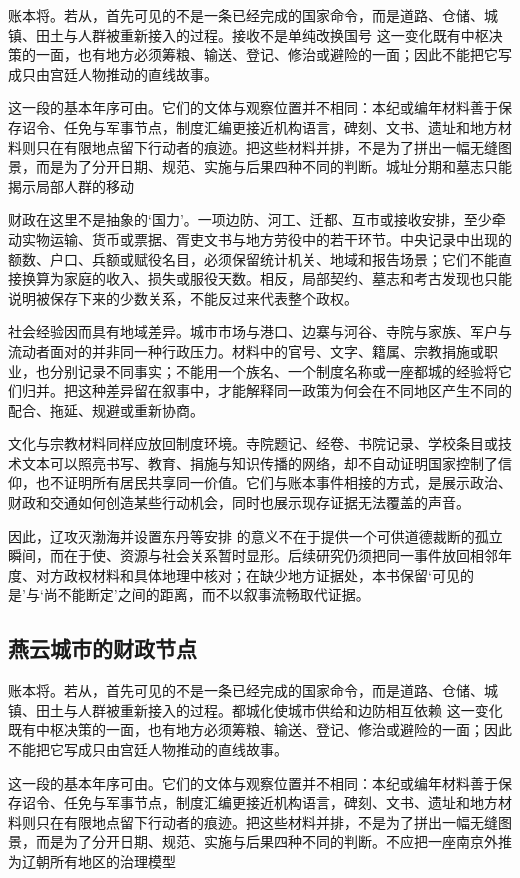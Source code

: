 账本将。若从，首先可见的不是一条已经完成的国家命令，而是道路、仓储、城镇、田土与人群被重新接入的过程。接收不是单纯改换国号 这一变化既有中枢决策的一面，也有地方必须筹粮、输送、登记、修治或避险的一面；因此不能把它写成只由宫廷人物推动的直线故事。

这一段的基本年序可由。它们的文体与观察位置并不相同：本纪或编年材料善于保存诏令、任免与军事节点，制度汇编更接近机构语言，碑刻、文书、遗址和地方材料则只在有限地点留下行动者的痕迹。把这些材料并排，不是为了拼出一幅无缝图景，而是为了分开日期、规范、实施与后果四种不同的判断。城址分期和墓志只能揭示局部人群的移动

财政在这里不是抽象的‘国力’。一项边防、河工、迁都、互市或接收安排，至少牵动实物运输、货币或票据、胥吏文书与地方劳役中的若干环节。中央记录中出现的额数、户口、兵额或赋役名目，必须保留统计机关、地域和报告场景；它们不能直接换算为家庭的收入、损失或服役天数。相反，局部契约、墓志和考古发现也只能说明被保存下来的少数关系，不能反过来代表整个政权。

社会经验因而具有地域差异。城市市场与港口、边寨与河谷、寺院与家族、军户与流动者面对的并非同一种行政压力。材料中的官号、文字、籍属、宗教捐施或职业，也分别记录不同事实；不能用一个族名、一个制度名称或一座都城的经验将它们归并。把这种差异留在叙事中，才能解释同一政策为何会在不同地区产生不同的配合、拖延、规避或重新协商。

文化与宗教材料同样应放回制度环境。寺院题记、经卷、书院记录、学校条目或技术文本可以照亮书写、教育、捐施与知识传播的网络，却不自动证明国家控制了信仰，也不证明所有居民共享同一价值。它们与账本事件相接的方式，是展示政治、财政和交通如何创造某些行动机会，同时也展示现存证据无法覆盖的声音。

因此，辽攻灭渤海并设置东丹等安排 的意义不在于提供一个可供道德裁断的孤立瞬间，而在于使、资源与社会关系暂时显形。后续研究仍须把同一事件放回相邻年度、对方政权材料和具体地理中核对；在缺少地方证据处，本书保留‘可见的是’与‘尚不能断定’之间的距离，而不以叙事流畅取代证据。

\subsection{燕云城市的财政节点}

账本将。若从，首先可见的不是一条已经完成的国家命令，而是道路、仓储、城镇、田土与人群被重新接入的过程。都城化使城市供给和边防相互依赖 这一变化既有中枢决策的一面，也有地方必须筹粮、输送、登记、修治或避险的一面；因此不能把它写成只由宫廷人物推动的直线故事。

这一段的基本年序可由。它们的文体与观察位置并不相同：本纪或编年材料善于保存诏令、任免与军事节点，制度汇编更接近机构语言，碑刻、文书、遗址和地方材料则只在有限地点留下行动者的痕迹。把这些材料并排，不是为了拼出一幅无缝图景，而是为了分开日期、规范、实施与后果四种不同的判断。不应把一座南京外推为辽朝所有地区的治理模型

